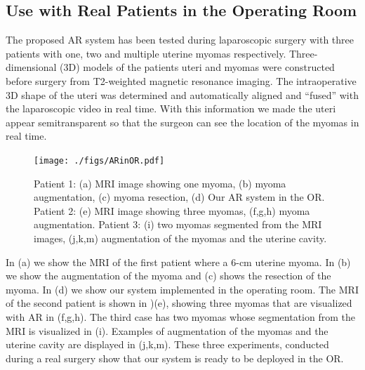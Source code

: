 \subsection{Use with Real Patients in the Operating Room}
The proposed AR system has been tested during laparoscopic surgery  with three patients with one, two and multiple uterine myomas respectively. Three-dimensional (3D) models of the patients uteri and myomas were constructed before surgery from T2-weighted magnetic resonance imaging. The intraoperative 3D shape of the uteri was determined and automatically aligned and ``fused'' with the laparoscopic video in real time. With this information we made the uteri appear semitransparent so that the surgeon can see the location of the myomas in real time. 
\begin{figure}[t]
  \centering
  \texttt{[image: ./figs/ARinOR.pdf]}
\caption{Patient 1: (a) MRI image showing one myoma, (b) myoma augmentation, (c) myoma resection, (d) Our AR system in the OR. Patient 2: (e) MRI image showing three myomas, (f,g,h) myoma augmentation. Patient 3: (i) two myomas segmented from the MRI images, (j,k,m) augmentation of the myomas and the uterine cavity. }
\label{fig:realOR}
\end{figure}
In (a) we show the MRI of the first patient where a 6-cm uterine myoma. In (b) we show the augmentation of the myoma and (c) shows the resection of the myoma. In (d) we show our system implemented in the operating room. The MRI of the second patient is shown in )(e), showing three myomas that are visualized with AR in (f,g,h). The third case has two myomas whose segmentation from the MRI is visualized in (i). Examples of augmentation of the myomas and the uterine cavity are displayed in (j,k,m). These three experiments, conducted during a real surgery show that our system is ready to be deployed in the OR.     
 

